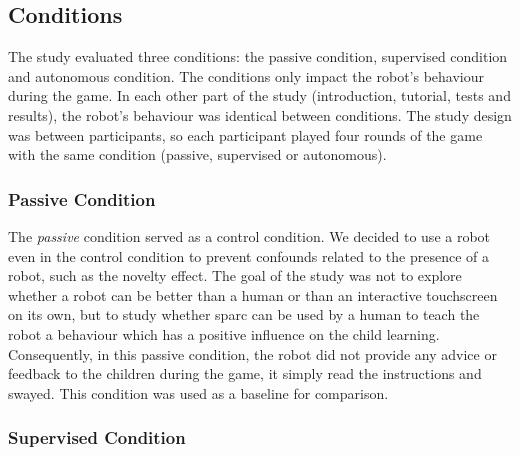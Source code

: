 \subsection{Conditions}
The study evaluated three conditions: the passive condition, supervised condition and autonomous condition. The conditions only impact the robot's behaviour during the game. In each other part of the study (introduction, tutorial, tests and results), the robot's behaviour was identical between conditions.
The study design was between participants, so each participant played four rounds of the game with the same condition (passive, supervised or autonomous).  %

\subsubsection{Passive Condition}

The \textit{passive} condition served as a control condition. We decided to use a robot even in the control condition to prevent confounds related to the presence of a robot, such as the novelty effect. The goal of the study was not to explore whether a robot can be better than a human or than an interactive touchscreen on its own, but to study whether \gls{sparc} can be used by a human to teach the robot a behaviour which has a positive influence on the child learning. Consequently, in this passive condition, the robot did not provide any advice or feedback to the children during the game, it simply read the instructions and swayed. This condition was used as a baseline for comparison.




\subsubsection{Supervised Condition}

